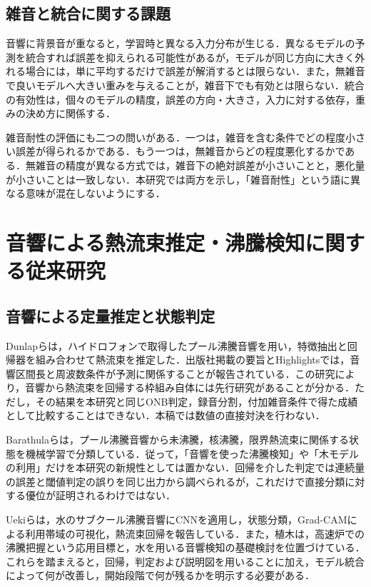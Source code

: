 \subsection{雑音と統合に関する課題}
音響に背景音が重なると，学習時と異なる入力分布が生じる．異なるモデルの予測を統合すれば誤差を抑えられる可能性があるが，モデルが同じ方向に大きく外れる場合には，単に平均するだけで誤差が解消するとは限らない．また，無雑音で良いモデルへ大きい重みを与えることが，雑音下でも有効とは限らない．統合の有効性は，個々のモデルの精度，誤差の方向・大きさ，入力に対する依存，重みの決め方に関係する．

雑音耐性の評価にも二つの問いがある．一つは，雑音を含む条件でどの程度小さい誤差が得られるかである．もう一つは，無雑音からどの程度悪化するかである．無雑音の精度が異なる方式では，雑音下の絶対誤差が小さいことと，悪化量が小さいことは一致しない．本研究では両方を示し，「雑音耐性」という語に異なる意味が混在しないようにする．

\section{音響による熱流束推定・沸騰検知に関する従来研究}
\subsection{音響による定量推定と状態判定}
Dunlapら\cite{dunlap2023}は，ハイドロフォンで取得したプール沸騰音響を用い，特徴抽出と回帰器を組み合わせて熱流束を推定した．出版社掲載の要旨とHighlightsでは，音響区間長と周波数条件が予測に関係することが報告されている．この研究により，音響から熱流束を回帰する枠組み自体には先行研究があることが分かる．ただし，その結果を本研究と同じONB判定，録音分割，付加雑音条件で得た成績として比較することはできない．本稿では数値の直接対決を行わない．

Barathulaら\cite{barathula2023}は，プール沸騰音響から未沸騰，核沸騰，限界熱流束に関係する状態を機械学習で分類している．従って，「音響を使った沸騰検知」や「木モデルの利用」だけを本研究の新規性としては置かない．回帰を介した判定では連続量の誤差と閾値判定の誤りを同じ出力から調べられるが，これだけで直接分類に対する優位が証明されるわけではない．

Uekiら\cite{ueki2025}は，水のサブクール沸騰音響にCNNを適用し，状態分類，Grad-CAMによる利用帯域の可視化，熱流束回帰を報告している．また，植木\cite{ueki2026}は，高速炉での沸騰把握という応用目標と，水を用いる音響検知の基礎検討を位置づけている．これらを踏まえると，回帰，判定および説明図を用いることに加え，モデル統合によって何が改善し，開始段階で何が残るかを明示する必要がある．

